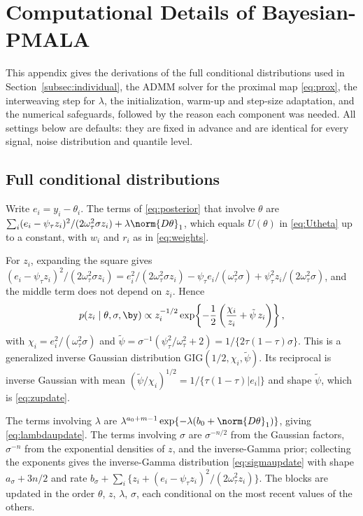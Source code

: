 \section{Computational Details of Bayesian-PMALA}
\label{app:pmala}

This appendix gives the derivations of the full conditional distributions used in Section~\ref{subsec:individual}, the ADMM solver for the proximal map \eqref{eq:prox}, the interweaving step for $\lambda$, the initialization, warm-up and step-size adaptation, and the numerical safeguards, followed by the reason each component was needed. All settings below are defaults: they are fixed in advance and are identical for every signal, noise distribution and quantile level.

\subsection{Full conditional distributions}
\label{app:pmala:conditionals}

Write $e_i = y_i - \theta_i$. The terms of \eqref{eq:posterior} that involve $\theta$ are $\sum_i (e_i - \psi_\tau z_i)^2/(2\omega_\tau^2\sigma z_i) + \lambda\norm{D\theta}_1$, which equals $U(\theta)$ in \eqref{eq:Utheta} up to a constant, with $w_i$ and $r_i$ as in \eqref{eq:weights}.

For $z_i$, expanding the square gives $(e_i - \psi_\tau z_i)^2/(2\omega_\tau^2\sigma z_i) = e_i^2/(2\omega_\tau^2\sigma z_i) - \psi_\tau e_i/(\omega_\tau^2\sigma) + \psi_\tau^2 z_i/(2\omega_\tau^2\sigma)$, and the middle term does not depend on $z_i$. Hence
\[
p(z_i \mid \theta, \sigma, \by) \propto z_i^{-1/2} \exp\!\left\{-\frac{1}{2}\left(\frac{\chi_i}{z_i} + \tilde\psi\, z_i\right)\right\},
\]
with $\chi_i = e_i^2/(\omega_\tau^2 \sigma)$ and $\tilde\psi = \sigma^{-1}(\psi_\tau^2/\omega_\tau^2 + 2) = 1/\{2\tau(1-\tau)\sigma\}$. This is a generalized inverse Gaussian distribution $\mathrm{GIG}(1/2, \chi_i, \tilde\psi)$. Its reciprocal is inverse Gaussian with mean $(\tilde\psi/\chi_i)^{1/2} = 1/\{\tau(1-\tau)|e_i|\}$ and shape $\tilde\psi$, which is \eqref{eq:zupdate}.

The terms involving $\lambda$ are $\lambda^{a_0+m-1}\exp\{-\lambda(b_0 + \norm{D\theta}_1)\}$, giving \eqref{eq:lambdaupdate}. The terms involving $\sigma$ are $\sigma^{-n/2}$ from the Gaussian factors, $\sigma^{-n}$ from the exponential densities of $z$, and the inverse-Gamma prior; collecting the exponents gives the inverse-Gamma distribution \eqref{eq:sigmaupdate} with shape $a_\sigma + 3n/2$ and rate $b_\sigma + \sum_i\{z_i + (e_i - \psi_\tau z_i)^2/(2\omega_\tau^2 z_i)\}$. The blocks are updated in the order $\theta$, $z$, $\lambda$, $\sigma$, each conditional on the most recent values of the others.

